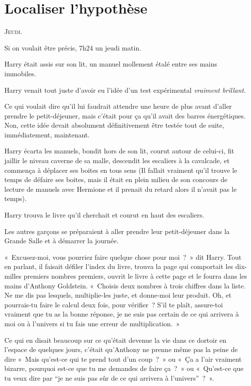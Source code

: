 \chapter{Localiser l'hypothèse}

\lettrine{J}{eudi}.

\hplettrineextrapara
Si on voulait être précis, 7h24 un jeudi matin.

Harry était assis sur son lit, un manuel mollement étalé entre ses mains immobiles.

Harry venait tout juste d'avoir eu l'idée d'un test expérimental \emph{vraiment brillant}.

Ce qui voulait dire qu'il lui faudrait attendre une heure de plus avant d'aller prendre le petit-déjeuner, mais c'était pour ça qu'il avait des barres énergétiques. Non, cette idée devait absolument définitivement être testée tout de suite, immédiatement, maintenant.

Harry écarta les manuels, bondit hors de son lit, courut autour de celui-ci, fit jaillir le niveau caverne de sa malle, descendit les escaliers à la cavalcade, et commença à déplacer ses boites en tous sens (Il fallait vraiment qu'il trouve le temps de défaire ses boites, mais il était en plein milieu de son concours de lecture de manuels avec Hermione et il prenait du retard alors il n'avait pas le temps).

Harry trouva le livre qu'il cherchait et courut en haut des escaliers.

Les autres garçons se préparaient à aller prendre leur petit-déjeuner dans la Grande Salle et à démarrer la journée.

«~Excusez-moi, vous pourriez faire quelque chose pour moi~?~» dit Harry. Tout en parlant, il faisait défiler l'index du livre, trouva la page qui comportait les dix-milles premiers nombres premiers, ouvrit le livre à cette page et le fourra dans les mains d'Anthony Goldstein. «~Choisis deux nombres à trois chiffres dans la liste. Ne me dis pas lesquels, multiplie-les juste, et donne-moi leur produit. Oh, et pourrais-tu faire le calcul deux fois, pour vérifier~? S'il te plaît, assure-toi vraiment que tu as la bonne réponse, je ne suis pas certain de ce qui arrivera à moi ou à l'univers si tu fais une erreur de multiplication.~»

Ce qui en disait beaucoup sur ce qu'était devenue la vie dans ce dortoir en l'espace de quelques jours, c'était qu'Anthony ne prenne même pas la peine de dire «~Mais qu'est-ce qui te prend tout d'un coup~?~» ou «~Ça a l'air vraiment bizarre, pourquoi est-ce que tu me demandes de faire ça~?~» ou «~Qu'est-ce que tu veux dire par “je ne suis pas sûr de ce qui arrivera à l'univers”~?~».

